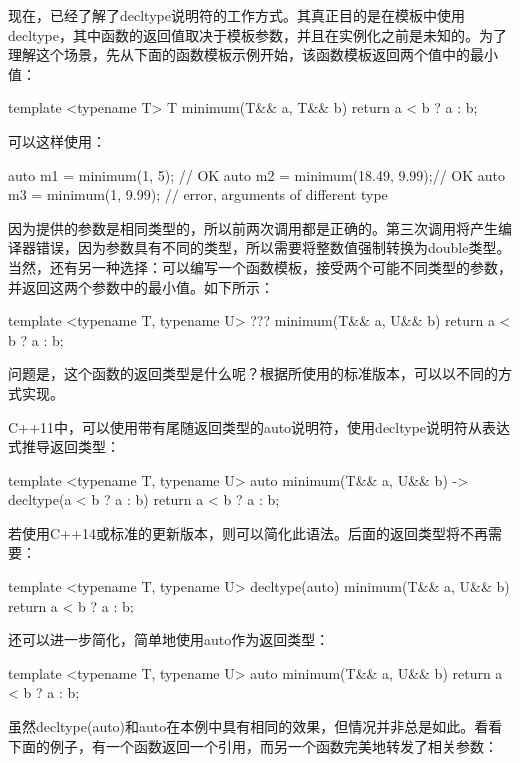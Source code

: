 现在，已经了解了decltype说明符的工作方式。其真正目的是在模板中使用decltype，其中函数的返回值取决于模板参数，并且在实例化之前是未知的。为了理解这个场景，先从下面的函数模板示例开始，该函数模板返回两个值中的最小值：

\begin{cppcode}
template <typename T>
T minimum(T&& a, T&& b)
{
	return a < b ? a : b;
}
\end{cppcode}

可以这样使用：

\begin{cppcode}
auto m1 = minimum(1, 5); // OK
auto m2 = minimum(18.49, 9.99);// OK
auto m3 = minimum(1, 9.99);
                    // error, arguments of different type
\end{cppcode}

因为提供的参数是相同类型的，所以前两次调用都是正确的。第三次调用将产生编译器错误，因为参数具有不同的类型，所以需要将整数值强制转换为double类型。当然，还有另一种选择：可以编写一个函数模板，接受两个可能不同类型的参数，并返回这两个参数中的最小值。如下所示：

\begin{cppcode}
template <typename T, typename U>
??? minimum(T&& a, U&& b)
{
	return a < b ? a : b;
}
\end{cppcode}

问题是，这个函数的返回类型是什么呢？根据所使用的标准版本，可以以不同的方式实现。

C++11中，可以使用带有尾随返回类型的auto说明符，使用decltype说明符从表达式推导返回类型：

\begin{cppcode}
template <typename T, typename U>
auto minimum(T&& a, U&& b) -> decltype(a < b ? a : b)
{
	return a < b ? a : b;
}
\end{cppcode}

若使用C++14或标准的更新版本，则可以简化此语法。后面的返回类型将不再需要：

\begin{cppcode}
template <typename T, typename U>
decltype(auto) minimum(T&& a, U&& b)
{
	return a < b ? a : b;
}
\end{cppcode}

还可以进一步简化，简单地使用auto作为返回类型：

\begin{cppcode}
template <typename T, typename U>
auto minimum(T&& a, U&& b)
{
	return a < b ? a : b;
}
\end{cppcode}

虽然decltype(auto)和auto在本例中具有相同的效果，但情况并非总是如此。看看下面的例子，有一个函数返回一个引用，而另一个函数完美地转发了相关参数：

